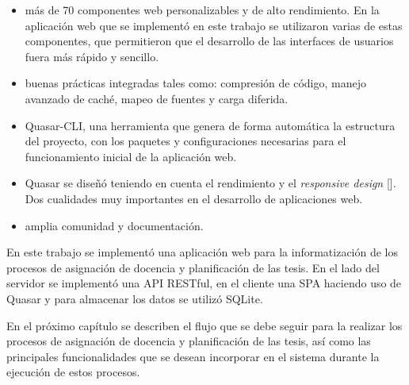 \begin{itemize}
    \item más de 70 componentes web personalizables y de alto rendimiento. En la aplicación web que se implementó en este trabajo 
    se utilizaron varias de estas componentes, que permitieron que el desarrollo de las interfaces de usuarios fuera más rápido y sencillo.
    \item buenas prácticas integradas tales como: compresión de código, 
    manejo avanzado de caché, mapeo de fuentes y carga diferida.
    \item Quasar-CLI, una herramienta que genera de forma automática la estructura del 
    proyecto, con los paquetes y configuraciones necesarias para el 
    funcionamiento inicial de la aplicación web.    
    \item Quasar se diseñó teniendo en cuenta el rendimiento y el \textit{responsive design} [\cite{quasar}].
    Dos cualidades muy importantes en el desarrollo de aplicaciones web. 
    \item amplia comunidad y documentación.
\end{itemize}


En este trabajo se implementó una aplicación web para la informatización de los procesos de 
asignación de docencia y planificación de las tesis. En el lado del servidor se implementó una 
API RESTful, en el cliente una SPA haciendo uso de Quasar y para almacenar los datos se 
utilizó SQLite.

En el próximo capítulo se describen el flujo que se debe seguir para 
la realizar los procesos de asignación de docencia y planificación de las tesis,
así como las principales funcionalidades
que se desean incorporar en el sistema durante la ejecución de 
estos procesos.








